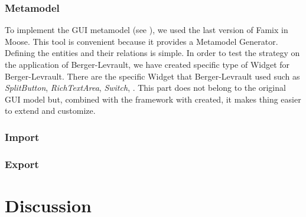 \documentclass[conference]{IEEEtran}
\begin{document}


    \subsubsection{Metamodel}
    \label{sec:metamodel}

    To implement the GUI metamodel (see ),
        we used the last version of Famix  in Moose.
    This tool is convenient because it provides a Metamodel Generator.
    Defining the entities and their relations is simple.
    In order to test the strategy on the application of Berger-Levrault,
        we have created specific type of Widget for Berger-Levrault.
    There are the specific Widget that Berger-Levrault used such as \textit{SplitButton}, \textit{RichTextArea}, \textit{Switch}, \etc.
    This part does not belong to the original GUI model but, 
        combined with the framework with created, it makes thing easier to extend and customize.

    \subsubsection{Import}
    \label{sec:import}

    \subsubsection{Export}
    \label{sec:export}

    
    
    \section{Discussion}
    \label{sec:discussion}
    
\end{document}
